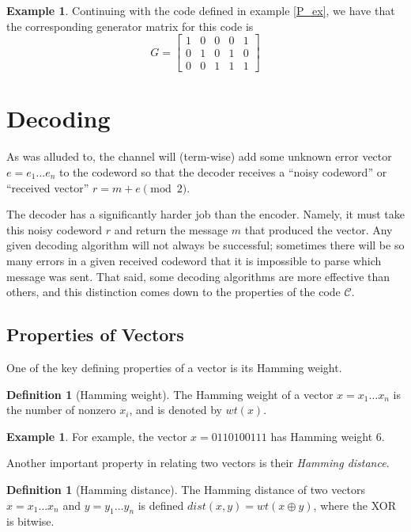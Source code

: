 \documentclass[12pt,twoside]{reedthesis}
\theoremstyle{definition}
\newtheorem{definition}[theorem]{Definition}
\newtheorem{example}[theorem]{Example}
\begin{document}
\begin{example}
Continuing with the code defined in example \ref{P_ex}, we have that the corresponding generator matrix for this code is 
\begin{equation*}
G = 
\left[
\begin{array}{ccc|cc}
1 & 0 & 0 	& 0 & 1	  \\
0 & 1& 0	& 	1 & 0 \\
0 & 0 & 1 	& 1 & 1
\end{array}
\right]
\end{equation*}
\end{example}

\section{Decoding}
As was alluded to, the channel will (term-wise) add some unknown error vector $e = e_1 \ldots e_n$ to the codeword so that the decoder receives a ``noisy codeword'' or ``received vector'' $r = m + e \pmod 2$. 

The decoder has a significantly harder job than the encoder. Namely, it must take this noisy codeword $r$ and return the message $m$ that produced the vector. Any given decoding algorithm will not always be successful; sometimes there will be so many errors in a given received codeword that it is impossible to parse which message was sent. That said, some decoding algorithms are more effective than others, and this distinction comes down to the properties of the code $\mathscr{C}$.

\subsection{Properties of Vectors}

One of the key defining properties of a vector is its Hamming weight.
\begin{definition}[Hamming weight] The Hamming weight of a vector $x = x_1  \ldots x_n$ is the number of nonzero $x_i$, and is denoted by $wt(x)$.
\end{definition}

\begin{example}
For example, the vector $x = 0110100111$ has Hamming weight 6.
\end{example}

Another important property in relating two vectors is their \textit{Hamming distance}.
\begin{definition}[Hamming distance] The Hamming distance of two vectors $x = x_1  \ldots x_n$  and $y = y_1 \ldots y_n$ is defined $dist(x,y) = wt(x \oplus y)$, where the XOR is bitwise.
\end{definition}
\end{document}
